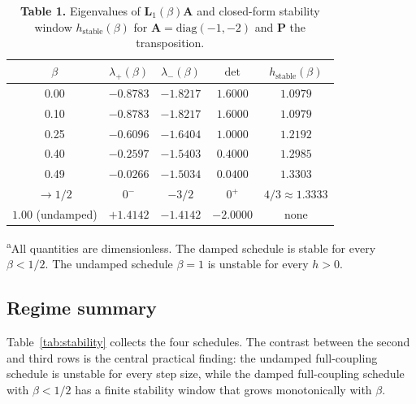 \documentclass[12pt, a4paper]{article}
\theoremstyle{plain}
\theoremstyle{definition}
\theoremstyle{remark}
\newcommand{\bP}{\mathbf{P}}
\newcommand{\bA}{\mathbf{A}}
\newcommand{\bL}{\mathbf{L}}
\begin{document}
\begin{table}[H]
  \centering
  \caption{\textbf{Table 1.} Eigenvalues of $\bL_1(\beta)\bA$ and closed-form
  stability window $h_{\mathrm{stable}}(\beta)$ for $\bA =
  \mathrm{diag}(-1,-2)$ and $\bP$ the transposition.}
  \label{tab:verify}
  \begin{tabular}{ccccc}
    \toprule
    $\beta$ & $\lambda_+(\beta)$ & $\lambda_-(\beta)$ & $\det$ & $h_{\mathrm{stable}}(\beta)$ \\
    \midrule
    0.00 & $-0.8783$ & $-1.8217$ & $1.6000$ & $1.0979$ \\
    0.10 & $-0.8783$ & $-1.8217$ & $1.6000$ & $1.0979$ \\
    0.25 & $-0.6096$ & $-1.6404$ & $1.0000$ & $1.2192$ \\
    0.40 & $-0.2597$ & $-1.5403$ & $0.4000$ & $1.2985$ \\
    0.49 & $-0.0266$ & $-1.5034$ & $0.0400$ & $1.3303$ \\
    $\to 1/2$ & $0^-$ & $-3/2$ & $0^+$ & $4/3 \approx 1.3333$ \\
    \midrule
    $1.00$ (undamped) & $+1.4142$ & $-1.4142$ & $-2.0000$ & none \\
    \bottomrule
  \end{tabular}
  \begin{flushleft}
    \footnotesize
    \textsuperscript{a}All quantities are dimensionless. The damped schedule
    is stable for every $\beta < 1/2$. The undamped schedule $\beta = 1$ is
    unstable for every $h > 0$.
  \end{flushleft}
\end{table}

\subsection{Regime summary}

Table~\ref{tab:stability} collects the four schedules. The contrast between
the second and third rows is the central practical finding: the undamped
full-coupling schedule is unstable for every step size, while the damped
full-coupling schedule with $\beta < 1/2$ has a finite stability window that
grows monotonically with $\beta$.
\end{document}
